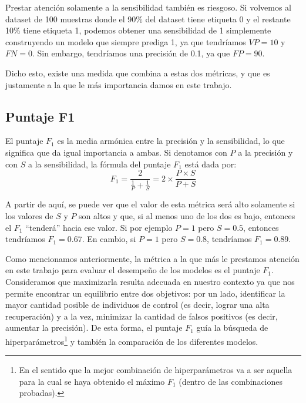 \documentclass[../../main.tex]{subfiles}
\begin{document}
Prestar atención solamente a la sensibilidad también es riesgoso. Si volvemos al dataset
de 100 muestras donde el 90\% del dataset tiene etiqueta 0 y el restante 10\% tiene
etiqueta 1, podemos obtener una sensibilidad de 1 simplemente construyendo un modelo que
siempre prediga 1, ya que tendríamos \(VP=10\) y \(FN=0\). Sin embargo, tendríamos
una precisión de 0.1, ya que \(FP=90\).

Dicho esto, existe una medida que combina a estas dos métricas, y que es justamente
a la que le más importancia damos en este trabajo.

\subsection{Puntaje F1}
El puntaje \(F_1\) es la media armónica entre la precisión y la sensibilidad, lo que significa
que da igual importancia a ambas. Si denotamos con \(P\) a la precisión y con \(S\) a la
sensibilidad, la fórmula del puntaje \(F_1\) está dada por:
\[
    F_1 = \frac{2}{\frac{1}{P} + \frac{1}{S}} = 2 \times \frac{P \times S}{P + S}
\]

A partir de aquí, se puede ver que el valor de esta métrica será alto solamente si los
valores de \(S\) y \(P\) son altos y que, si al menos uno de los dos es bajo, entonces el
\(F_1\) ``tenderá'' hacia ese valor. Si por ejemplo \(P=1\) pero \(S=0.5\), entonces
tendríamos \(F_1 = 0.67\). En cambio, si \(P=1\) pero \(S=0.8\), tendríamos \(F_1 =
0.89\).

\bigskip
Como mencionamos anteriormente, la métrica a la que más le prestamos atención en este
trabajo para evaluar el desempeño de los modelos es el puntaje \(F_1\). Consideramos que
maximizarla resulta adecuada en nuestro contexto ya que nos permite encontrar un
equilibrio entre dos objetivos: por un lado, identificar la mayor cantidad posible de
individuos de control (es decir, lograr una alta recuperación) y a la vez, minimizar la
cantidad de falsos positivos (es decir, aumentar la precisión). De esta forma, el puntaje
\(F_1\) guía la búsqueda de hiperparámetros\footnote{En el sentido que la mejor
combinación de hiperparámetros va a ser aquella para la cual se haya obtenido el máximo
\(F_1\) (dentro de las combinaciones probadas).} y también la comparación de los
diferentes modelos.
\end{document}
